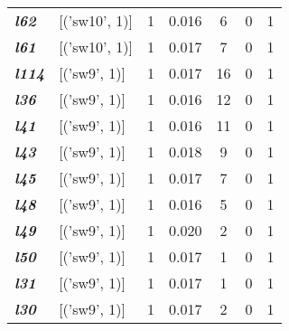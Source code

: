 \begin{table}
\begin{tabular}{llccccc}
    \textit{\textbf{l62}}                                            & {[}('sw10', 1){]}            & 1             & 0.016              & 6              & 0              & 1           \\
    \textit{\textbf{l61}}                                            & {[}('sw10', 1){]}            & 1             & 0.017              & 7              & 0              & 1           \\
    \textit{\textbf{l114}}                                           & {[}('sw9', 1){]}             & 1             & 0.017              & 16             & 0              & 1           \\
    \textit{\textbf{l36}}                                            & {[}('sw9', 1){]}             & 1             & 0.016              & 12             & 0              & 1           \\
    \textit{\textbf{l41}}                                            & {[}('sw9', 1){]}             & 1             & 0.016              & 11             & 0              & 1           \\
    \textit{\textbf{l43}}                                            & {[}('sw9', 1){]}             & 1             & 0.018              & 9              & 0              & 1           \\
    \textit{\textbf{l45}}                                            & {[}('sw9', 1){]}             & 1             & 0.017              & 7              & 0              & 1           \\
    \textit{\textbf{l48}}                                            & {[}('sw9', 1){]}             & 1             & 0.016              & 5              & 0              & 1           \\
    \textit{\textbf{l49}}                                            & {[}('sw9', 1){]}             & 1             & 0.020              & 2              & 0              & 1           \\
    \textit{\textbf{l50}}                                            & {[}('sw9', 1){]}             & 1             & 0.017              & 1              & 0              & 1           \\
    \textit{\textbf{l31}}                                            & {[}('sw9', 1){]}             & 1             & 0.017              & 1              & 0              & 1           \\
    \textit{\textbf{l30}}                                            & {[}('sw9', 1){]}             & 1             & 0.017              & 2              & 0              & 1           \\

\end{tabular}
\end{table}
